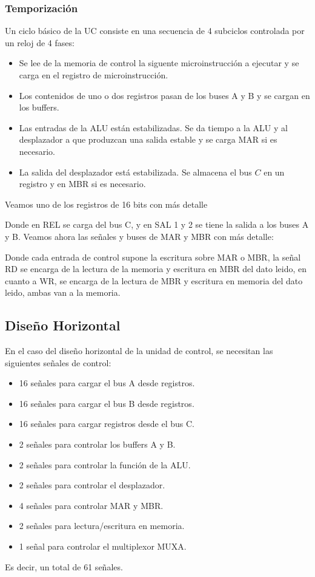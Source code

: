 \subsubsection{Temporización}
Un ciclo básico de la UC consiste en una secuencia de 4 subciclos controlada por un reloj de 4 fases:
\begin{itemize}
    \item Se lee de la memoria de control la siguente microinstrucción a ejecutar y se carga en el registro de microinstrucción.
    \item Los contenidos de uno o dos registros pasan de los buses A y B y se cargan en los buffers.
    \item Las entradas de la ALU están estabilizadas. Se da tiempo a la ALU y al desplazador a que produzcan una salida estable y se carga MAR si es necesario.
    \item La salida del desplazador está estabilizada. Se almacena el bus $C$ en un registro y en MBR si es necesario.
\end{itemize}
Veamos uno de los registros de 16 bits con más detalle
\begin{center}
    
\end{center}
Donde en REL se carga del bus C, y en SAL 1 y 2 se tiene la salida a los buses A y B. Veamos ahora las señales y buses de 
MAR y MBR con más detalle:
\begin{center}
    
\end{center}
Donde cada entrada de control supone la escritura sobre MAR o MBR, la señal RD se encarga de la lectura de la memoria y escritura en MBR del dato leido, en cuanto a WR, 
se encarga de la lectura de MBR y escritura en memoria del dato leido, ambas van a la memoria.
\subsection{Diseño Horizontal}
En el caso del diseño horizontal de la unidad de control, se necesitan las siguientes señales de control:
\begin{itemize}
    \item 16 señales para cargar el bus A desde registros.
    \item 16 señales para cargar el bus B desde registros.
    \item 16 señales para cargar registros desde el bus C.
    \item 2 señales para controlar los buffers A y B.
    \item 2 señales para controlar la función de la ALU.
    \item 2 señales para controlar el desplazador.
    \item 4 señales para controlar MAR y MBR.
    \item 2 señales para lectura/escritura en memoria.
    \item 1 señal para controlar el multiplexor MUXA.
\end{itemize}
Es decir, un total de 61 señales.
